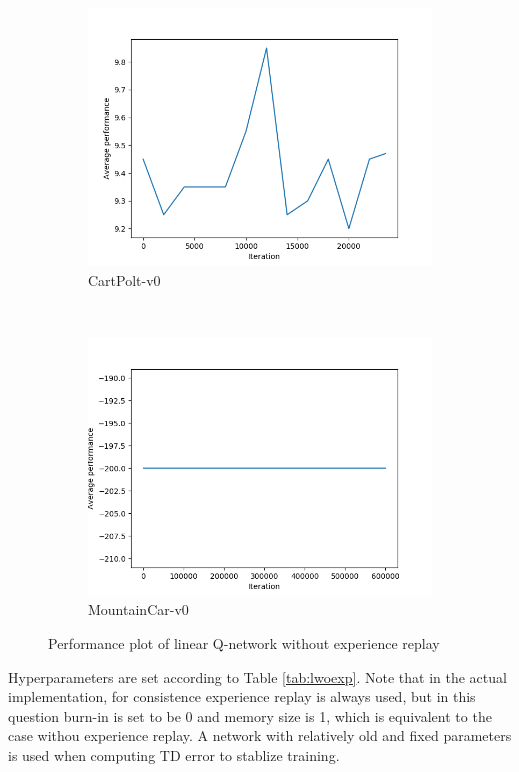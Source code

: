 \documentclass[12pt]{article}
\begin{document}
\begin{figure}[h!]
    \centering
    \begin{subfigure}[t]{0.6\textwidth}
        \includegraphics[width=1\textwidth]{figs/Q1_cp.png}
        \caption{CartPolt-v0}
    \end{subfigure}
    ~
    \begin{subfigure}[t]{0.6\textwidth}
        \includegraphics[width=1\textwidth]{figs/Q1_mc.png}
        \caption{MountainCar-v0}
    \end{subfigure}
    \caption{Performance plot of linear Q-network without experience replay}
    \label{fig:q1}
\end{figure}

Hyperparameters are set according to Table \ref{tab:lwoexp}. Note that in the actual implementation, for consistence experience replay is always used, but in this question burn-in is set to be 0 and memory size is 1, which is equivalent to the case withou experience replay. A network with relatively old and fixed parameters is used when computing TD error to stablize training.
\end{document}
